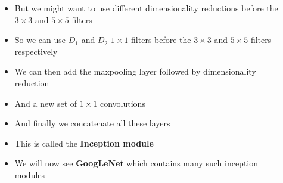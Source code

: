 
\begin{frame}
	\begin{columns}
		\begin{overlayarea}{\textwidth}{\textheight}
			
		\end{overlayarea}
		\begin{overlayarea}{\textwidth}{\textheight}
			\begin{itemize}
				\justifying
				\item<1-> But we might want to use different dimensionality reductions before the $3 \times 3$ and $5 \times 5$ filters
				\item<2-> So we can use $D_1$ and $D_2$ $1\times 1$ filters before the $3 \times 3$ and $5 \times 5$ filters respectively
				\item<3-> We can then add the maxpooling layer followed by dimensionality reduction
				\item<4-> And a new set of $1\times 1$ convolutions
				\item<5-> And finally we concatenate all these layers
				\item<6-> This is called the \textbf{Inception module}
				\item<7-> We will now see \textbf{GoogLeNet} which contains many such inception modules
			\end{itemize}
		\end{overlayarea}
	\end{columns}
\end{frame}


